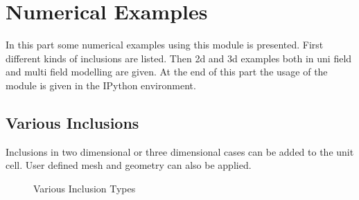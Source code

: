 %
%
%
%
%
%

\chapter{Numerical Examples}
In this part some numerical examples using this module is presented. First different kinds of inclusions are listed. Then 2d and 3d examples both in uni field and multi field modelling are given. At the end of this part the usage of the module is given in the IPython environment.

\section{Various Inclusions}
Inclusions in two dimensional or three dimensional cases can be added to the unit cell. User defined mesh and geometry can also be applied.

\begin{figure}[h]
  \centering
  \caption{Various Inclusion Types}
  \label{fig: inc} %
\end{figure} 

